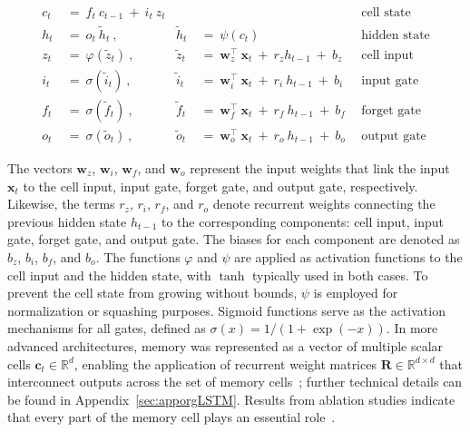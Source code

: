 \begin{align}
c_t \ &= \  f_t \ c_{t-1} \ + \ i_t \ z_t &  & &\text{cell state} \\
h_t  \ &= \ o_t \ \tilde{h}_t \ , & \tilde{h}_t \ &= \ \psi \left( c_t\right)
  &\text{hidden state} \\
z_t \ &= \ \varphi \left( \tilde{z}_t \right) \ , 
  &\tilde{z}_t \ &=  \ \mathbf{w}^\top_{z} \ \mathbf{x}_t \ + \
  r_{z}  h_{t-1} \ + \  b_{z} \ \
  &\text{cell input} \\
i_t \ &= \ \sigma \left( \tilde{i}_t  \right) \ , 
  &\tilde{i}_t \ &= \ \mathbf{w}^\top_{i} \ \mathbf{x}_t \ + \
  r_{i}  \ h_{t-1} \ + \  b_{i} \ \
  &\text{input gate} \\
f_t \ &= \ \sigma \left(  \tilde{f}_t \right) \ , 
  &\tilde{f}_t \ &= \ \mathbf{w}^\top_{f} \ \mathbf{x}_t  \ + \
  r_{f}  \ h_{t-1} \ + \  b_{f} \ \
  &\text{forget gate} \\
o_t \ &= \ \sigma \left( \tilde{o}_t \right) \ , 
  &\tilde{o}_t  \ &= \ \mathbf{w}^\top_{o} \ \mathbf{x}_t \ + \
  r_{o}  \ h_{t-1} \ + \  b_{o} \ \
  &\text{output gate} 
\end{align}

The vectors $\mathbf{w}_{z}$, $\mathbf{w}_{i}$, $\mathbf{w}_{f}$, and $\mathbf{w}_{o}$ represent the input weights that link the input $\mathbf{x}_t$ to the cell input, input gate, forget gate, and output gate, respectively. Likewise, the terms $r_{z}$, $r_{i}$, $r_{f}$, and $r_{o}$ denote recurrent weights connecting the previous hidden state $h_{t-1}$ to the corresponding components: cell input, input gate, forget gate, and output gate. The biases for each component are denoted as $b_{z}$, $b_{i}$, $b_{f}$, and $b_{o}$. The functions $\varphi$ and $\psi$ are applied as activation functions to the cell input and the hidden state, with $\tanh$ typically used in both cases. To prevent the cell state from growing without bounds, $\psi$ is employed for normalization or squashing purposes. Sigmoid functions serve as the activation mechanisms for all gates, defined as $\sigma \left( x \right) = 1/(1+\exp(-x))$. In more advanced architectures, memory was represented as a vector of multiple scalar cells $\mathbf{c}_t \in \mathbb{R}^{d}$, enabling the application of recurrent weight matrices $\mathbf{R} \in \mathbb{R}^{d \times d}$ that interconnect outputs across the set of memory cells~\citep{Greff:15}; further technical details can be found in Appendix~\ref{sec:apporgLSTM}. Results from ablation studies indicate that every part of the memory cell plays an essential role~\citep{Greff:15}.

